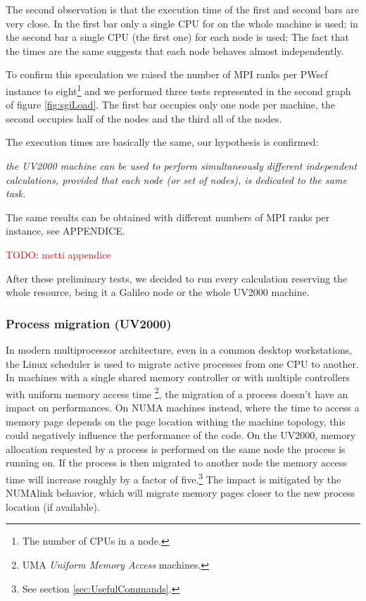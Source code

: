 \documentclass[a4paper,12pt]{article}
\newcommand\mynotes[1]{\begin{flushright}

\textcolor{red}{TODO: #1}\end{flushright}}
\begin{document}
The second observation is that the execution time of the first and second bars are very close. 
In the first bar only a single CPU for on the whole machine is used; in the second bar a single CPU (the first one) for each node is used;
The fact that the times are the same suggests that each node behaves almost independently.

To confirm this speculation we raised the number of MPI ranks per PWscf instance to eight\footnote{The number of CPUs in a node.} and we performed three tests represented  in the second graph of figure \ref{fig:sgiLoad}.
The first bar occupies only one node per machine, the second occupies half of the nodes and the third all of the nodes.

The execution times are basically the same, our hypothesis is confirmed:

\begin{center}
\textit{the UV2000 machine can be used to perform simultaneously different independent calculations, provided that each node (or set of nodes), is dedicated to the same task.}
\end{center}

The same results can be obtained with different numbers of MPI ranks per instance, see APPENDICE.
\mynotes{metti appendice}

\begin{framed}
After these preliminary tests, we decided to run every calculation reserving the whole resource, being it a Galileo node or the whole UV2000 machine.
\end{framed}



\subsubsection{Process migration (UV2000)}

In modern multiprocessor architecture, even in a common desktop workstations, the Linux scheduler is used to migrate active processes from one CPU to another. 
In machines with a single shared memory controller  or with multiple controllers with uniform memory access time \footnote{UMA \textit{Uniform Memory Access} machines.}, the migration of a process doesn't have an impact on performances.
On NUMA machines instead, where the time to access a memory page depends on the page location withing the machine topology, this could negatively influence the performance of the code.
On the UV2000, memory allocation requested by a process is performed on the same node the process is running on. 
If the process is then migrated to another node the memory access time will increase roughly by a factor of five.\footnote{See section \ref{sec:UsefulCommands}.}
The impact is mitigated by the NUMAlink behavior, which will migrate memory pages closer to the new process location (if available).
\end{document}

